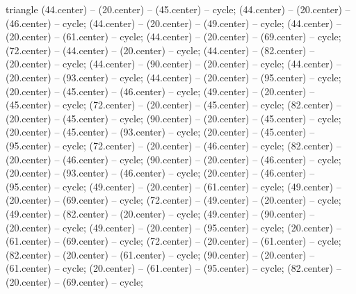 \begin{pgfonlayer}{triangle}
 (44.center) -- (20.center) -- (45.center) -- cycle; 
 (44.center) -- (20.center) -- (46.center) -- cycle; 
 (44.center) -- (20.center) -- (49.center) -- cycle; 
 (44.center) -- (20.center) -- (61.center) -- cycle; 
 (44.center) -- (20.center) -- (69.center) -- cycle; 
 (72.center) -- (44.center) -- (20.center) -- cycle; 
 (44.center) -- (82.center) -- (20.center) -- cycle; 
 (44.center) -- (90.center) -- (20.center) -- cycle; 
 (44.center) -- (20.center) -- (93.center) -- cycle; 
 (44.center) -- (20.center) -- (95.center) -- cycle; 
 (20.center) -- (45.center) -- (46.center) -- cycle; 
 (49.center) -- (20.center) -- (45.center) -- cycle; 
 (72.center) -- (20.center) -- (45.center) -- cycle; 
 (82.center) -- (20.center) -- (45.center) -- cycle; 
 (90.center) -- (20.center) -- (45.center) -- cycle; 
 (20.center) -- (45.center) -- (93.center) -- cycle; 
 (20.center) -- (45.center) -- (95.center) -- cycle; 
 (72.center) -- (20.center) -- (46.center) -- cycle; 
 (82.center) -- (20.center) -- (46.center) -- cycle; 
 (90.center) -- (20.center) -- (46.center) -- cycle; 
 (20.center) -- (93.center) -- (46.center) -- cycle; 
 (20.center) -- (46.center) -- (95.center) -- cycle; 
 (49.center) -- (20.center) -- (61.center) -- cycle; 
 (49.center) -- (20.center) -- (69.center) -- cycle; 
 (72.center) -- (49.center) -- (20.center) -- cycle; 
 (49.center) -- (82.center) -- (20.center) -- cycle; 
 (49.center) -- (90.center) -- (20.center) -- cycle; 
 (49.center) -- (20.center) -- (95.center) -- cycle; 
 (20.center) -- (61.center) -- (69.center) -- cycle; 
 (72.center) -- (20.center) -- (61.center) -- cycle; 
 (82.center) -- (20.center) -- (61.center) -- cycle; 
 (90.center) -- (20.center) -- (61.center) -- cycle; 
 (20.center) -- (61.center) -- (95.center) -- cycle; 
 (82.center) -- (20.center) -- (69.center) -- cycle; 

\end{pgfonlayer}
